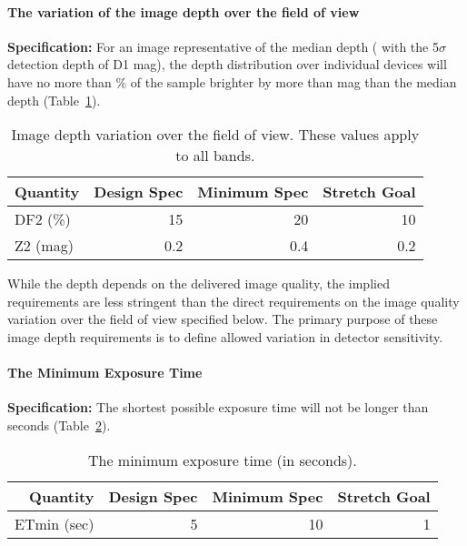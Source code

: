 \paragraph{The variation of the image depth over the field of view\\}

{\bf Specification:} For an image representative of the median depth (\ie
 with the 5$\sigma$ detection depth of D1 mag), the depth distribution
over individual devices will have no more than
\% of the sample brighter by more than
mag than the median depth (Table~\ref{depthVarFOV}).

\begin{table}[h]
\begin{tabular}{|l|r|r|r|}
\hline
Quantity   & Design Spec & Minimum Spec & Stretch Goal       \\
\hline
      DF2 (\%) &    15       &      20     &      10         \\
      Z2 (mag) &    0.2      &      0.4    &     0.2         \\
\hline
\end{tabular}
\caption{Image depth variation over the field of view. These values
apply to all bands.}
\label{depthVarFOV}
\end{table}

While the depth depends on the delivered image quality, the implied
requirements are less stringent than the direct requirements on the image
quality variation over the field of view specified below.  The primary
purpose of these image depth requirements is to define allowed variation in
detector sensitivity.


\newpage
\paragraph{The Minimum Exposure Time\\}

{\bf Specification:} The shortest possible exposure time will not be
longer than
seconds (Table~\ref{minTexp}).


\begin{table}[h]
\begin{tabular}{|r|r|r|r|}
\hline
Quantity   & Design Spec & Minimum Spec & Stretch Goal           \\
\hline
      ETmin (sec)  &      5       &      10      &       1       \\
\hline
\end{tabular}
\caption{The minimum exposure time (in seconds). }
\label{minTexp}
\end{table}

